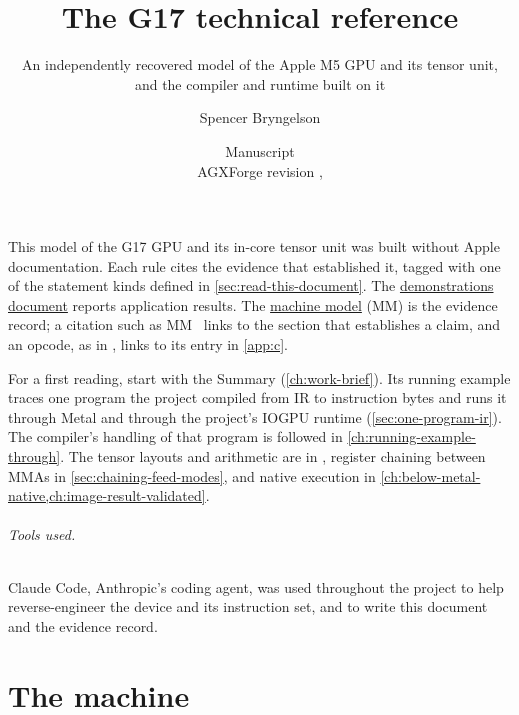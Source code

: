 \documentclass[11pt, letterpaper, oneside, open=any, numbers=noenddot]{scrreprt}
\title{\Huge The G17 technical reference}
\subtitle{An independently recovered model of the Apple M5 GPU and its tensor unit,\\
and the compiler and runtime built on it}
\author{Spencer Bryngelson}
\date{Manuscript\\[2pt]\small AGXForge revision \code{\docrevision}\ifx\docrevdate\empty\else, \docrevdate\fi}
\begin{document}
\maketitle


This model of the G17 GPU and its in-core tensor unit was built without Apple documentation. Each rule cites the
evidence that established it, tagged with one of the statement kinds defined in \cref{sec:read-this-document}. The
\href{https://github.com/sbryngelson/AGXForge/blob/main/docs/demonstrations.md}{demonstrations document} reports application results. The
\href{https://github.com/sbryngelson/AGXForge/blob/main/docs/g17-tensorops-machine-model.md}{machine model} (MM) is the
evidence record; a citation such as MM~ links to the section that establishes a claim, and an opcode, as in
, links to its entry in \cref{app:c}.

For a first reading, start with the Summary (\cref{ch:work-brief}). Its running example traces one program the project
compiled from IR to instruction bytes and runs it through Metal and through the project's IOGPU runtime
(\cref{sec:one-program-ir}). The compiler's handling of that program is followed in \cref{ch:running-example-through}.
The tensor layouts and arithmetic are in , register
chaining between MMAs in \cref{sec:chaining-feed-modes}, and native execution in
\cref{ch:below-metal-native,ch:image-result-validated}.

\paragraph{Tools used.} Claude Code, Anthropic's coding agent, was used throughout the project to help reverse-engineer
the device and its instruction set, and to write this document and the evidence record.

\tableofcontents

\setcounter{chapter}{-1}

\part{The machine}\label{part:i}














\end{document}
